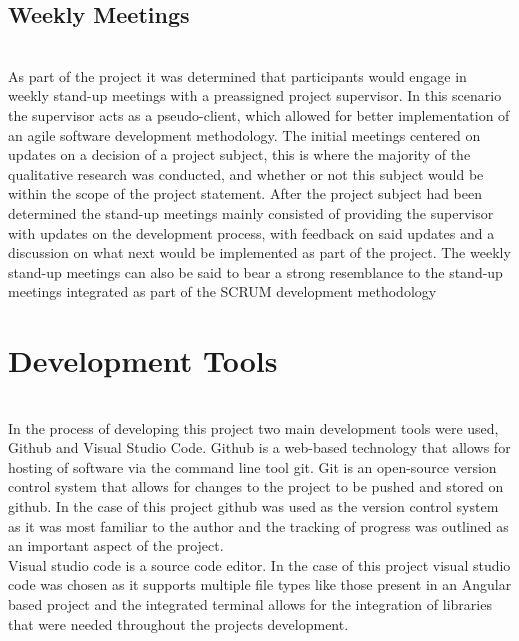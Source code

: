 \subsection{Weekly Meetings} \\
As part of the project it was determined that participants would engage in weekly stand-up meetings with a preassigned project supervisor. In this scenario the supervisor acts as a pseudo-client, which allowed for better implementation of an agile software development methodology. The initial meetings centered on updates on a decision of a project subject, this is where the majority of the qualitative research was conducted, and whether or not this subject would be within the scope of the project statement. After the project subject had been determined the stand-up meetings mainly consisted of providing the supervisor with updates on the development process, with feedback on said updates and a discussion on what next would be implemented as part of the project. The weekly stand-up meetings can also be said to bear a strong resemblance to the stand-up meetings integrated as part of the SCRUM development methodology

\section{Development Tools} \\
In the process of developing this project two main development tools were used, Github and Visual Studio Code. Github is a web-based technology that allows for hosting of software via the command line tool git. Git is an open-source version control system that allows for changes to the project to be pushed and stored on github. In the case of this project github was used as the version control system as it was most familiar to the author and the tracking of progress was outlined as an important aspect of the project.\\
Visual studio code is a source code editor. In the case of this project visual studio code was chosen as it supports multiple file types like those present in an Angular based project and the integrated terminal allows for the integration of libraries that were needed throughout the projects development.



